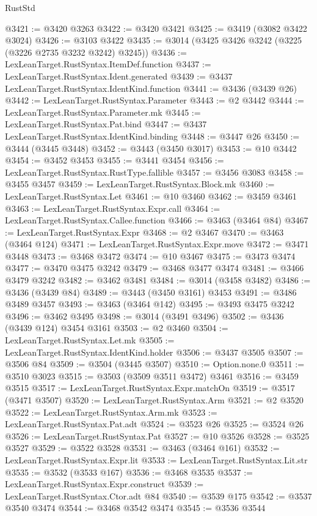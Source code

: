 \begin{lexlean}{RustStd}
\begin{coremodule}
@3421 := @3420 @3263
@3422 := @3420 @3421
@3425 := @3419 (@3082 @3422 @3024)
@3426 := @3103 @3422
@3435 := @3014 (@3425 @3426 @3242 (@3225 (@3226 @2735 @3232 @3242) @3245))
@3436 := LexLeanTarget.RustSyntax.ItemDef.function
@3437 := LexLeanTarget.RustSyntax.Ident.generated
@3439 := @3437 LexLeanTarget.RustSyntax.IdentKind.function
@3441 := @3436 (@3439 @26)
@3442 := LexLeanTarget.RustSyntax.Parameter
@3443 := @2 @3442
@3444 := LexLeanTarget.RustSyntax.Parameter.mk
@3445 := LexLeanTarget.RustSyntax.Pat.bind
@3447 := @3437 LexLeanTarget.RustSyntax.IdentKind.binding
@3448 := @3447 @26
@3450 := @3444 (@3445 @3448)
@3452 := @3443 (@3450 @3017)
@3453 := @10 @3442
@3454 := @3452 @3453
@3455 := @3441 @3454
@3456 := LexLeanTarget.RustSyntax.RustType.fallible
@3457 := @3456 @3083
@3458 := @3455 @3457
@3459 := LexLeanTarget.RustSyntax.Block.mk
@3460 := LexLeanTarget.RustSyntax.Let
@3461 := @10 @3460
@3462 := @3459 @3461
@3463 := LexLeanTarget.RustSyntax.Expr.call
@3464 := LexLeanTarget.RustSyntax.Callee.function
@3466 := @3463 (@3464 @84)
@3467 := LexLeanTarget.RustSyntax.Expr
@3468 := @2 @3467
@3470 := @3463 (@3464 @124)
@3471 := LexLeanTarget.RustSyntax.Expr.move
@3472 := @3471 @3448
@3473 := @3468 @3472
@3474 := @10 @3467
@3475 := @3473 @3474
@3477 := @3470 @3475 @3242
@3479 := @3468 @3477 @3474
@3481 := @3466 @3479 @3242
@3482 := @3462 @3481
@3484 := @3014 (@3458 @3482)
@3486 := @3436 (@3439 @84)
@3489 := @3443 (@3450 @3161) @3453
@3491 := @3486 @3489 @3457
@3493 := @3463 (@3464 @142)
@3495 := @3493 @3475 @3242
@3496 := @3462 @3495
@3498 := @3014 (@3491 @3496)
@3502 := @3436 (@3439 @124) @3454 @3161
@3503 := @2 @3460
@3504 := LexLeanTarget.RustSyntax.Let.mk
@3505 := LexLeanTarget.RustSyntax.IdentKind.holder
@3506 := @3437 @3505
@3507 := @3506 @84
@3509 := @3504 (@3445 @3507)
@3510 := Option.none.{0}
@3511 := @3510 @3023
@3515 := @3503 (@3509 @3511 @3472) @3461
@3516 := @3459 @3515
@3517 := LexLeanTarget.RustSyntax.Expr.matchOn
@3519 := @3517 (@3471 @3507)
@3520 := LexLeanTarget.RustSyntax.Arm
@3521 := @2 @3520
@3522 := LexLeanTarget.RustSyntax.Arm.mk
@3523 := LexLeanTarget.RustSyntax.Pat.adt
@3524 := @3523 @26
@3525 := @3524 @26
@3526 := LexLeanTarget.RustSyntax.Pat
@3527 := @10 @3526
@3528 := @3525 @3527
@3529 := @3522 @3528
@3531 := @3463 (@3464 @161)
@3532 := LexLeanTarget.RustSyntax.Expr.lit
@3533 := LexLeanTarget.RustSyntax.Lit.str
@3535 := @3532 (@3533 @167)
@3536 := @3468 @3535
@3537 := LexLeanTarget.RustSyntax.Expr.construct
@3539 := LexLeanTarget.RustSyntax.Ctor.adt @84
@3540 := @3539 @175
@3542 := @3537 @3540 @3474
@3544 := @3468 @3542 @3474
@3545 := @3536 @3544

\end{coremodule}
\end{lexlean}
